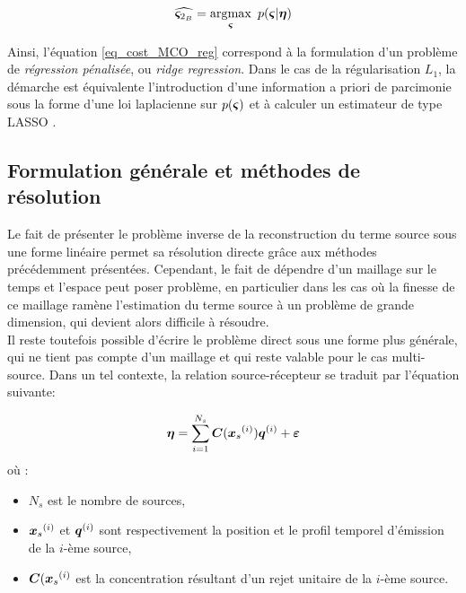 \begin{equation}
\widehat{{\bm{\varsigma}}_{2_B}} = \operatorname*{\arg\!\max}_{\bm{\varsigma}}~ p({\bm{\varsigma}} | {\bm{\eta}})
\label{eq_MAP}
\end{equation}

Ainsi, l'équation \eqref{eq_cost_MCO_reg} correspond à la formulation d'un problème de \textit{régression pénalisée}, ou \textit{ridge regression}. Dans le cas de la régularisation $L_1$, la démarche est équivalente l'introduction d'une information a priori de parcimonie sous la forme d'une loi laplacienne sur $p({\bm{\varsigma}})$ et à calculer un estimateur de type LASSO \cite{Tibshirani1996}.\\

\subsection{Formulation générale et méthodes de résolution}

Le fait de présenter le problème inverse de la reconstruction du terme source sous une forme linéaire permet sa résolution directe grâce aux méthodes précédemment présentées. Cependant, le fait de dépendre d'un maillage sur le temps et l'espace peut poser problème, en particulier dans les cas où la finesse de ce maillage ramène l'estimation du terme source à un problème de grande dimension, qui devient alors difficile à résoudre. \\

Il reste toutefois possible d'écrire le problème direct sous une forme plus générale, qui ne tient pas compte d'un maillage et qui reste valable pour le cas multi-source. Dans un tel contexte, la relation source-récepteur se traduit par l'équation suivante:

\begin{equation}
	{\bm{\eta}} = \sum\limits_{i=1}^{N_s} {\bm{C}}({\bm{x}_s}^{(i)}){\bm{q}}^{(i)} + {\bm{\varepsilon}}
	\label{eq_SR_nonlineaire}
\end{equation}
où :
\begin{itemize}
	\item $N_s$ est le nombre de sources, 
	\item ${\bm{x}_s}^{(i)}$ et ${\bm{q}}^{(i)}$ sont respectivement la position et le profil temporel d'émission de la $i$-ème source,
	\item ${\bm{C}}({\bm{x}_s}^{(i)}$ est la concentration résultant d'un rejet unitaire de la $i$-ème source.\\
\end{itemize}


